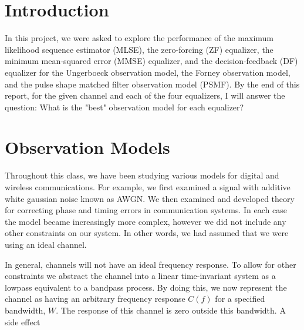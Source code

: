 

\usepackage{indentfirst}


\section{Introduction}

In this project, we were asked to explore the performance of the maximum likelihood sequence estimator (MLSE), the zero-forcing (ZF) equalizer, the minimum mean-squared error (MMSE) equalizer, and the decision-feedback (DF) equalizer for the Ungerboeck observation model, the Forney observation model, and the pulse shape matched filter observation model (PSMF). By the end of this report, for the given channel and each of the four equalizers, I will answer the question:  What is the "best" observation model for each equalizer?

\section{Observation Models}
Throughout this class, we have been studying various models for digital and wireless communications.  For example, we first examined a signal with additive white gaussian noise known as AWGN. We then examined and developed theory for correcting phase and timing errors in communication systems. In each case the model became increasingly more complex, however we did not include any other constraints on our system. In other words, we had assumed that we were using an ideal channel.

In general, channels will not have an ideal frequency response. To allow for other constraints we abstract the channel into a linear time-invariant system as a lowpass equivalent to a bandpass process. By doing this, we now represent the channel as having an arbitrary frequency response $C(f)$ for a specified bandwidth, $W$. The response of this channel is zero outside this bandwidth. A side effect




